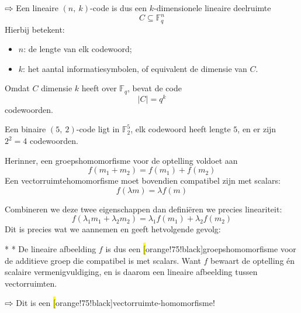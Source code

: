 $\rightwhitearrow$ Een lineaire $(n,\ k)$-code is dus een $k$-dimensionele lineaire deelruimte
\begin{equation*}
    C \subseteq \mathbb{F}_q^n
\end{equation*}
Hierbij betekent:
\begin{itemize}
    \item $n$: de lengte van elk codewoord;
    \item $k$: het aantal informatiesymbolen, of equivalent de dimensie van $C$.
\end{itemize}
Omdat $C$ dimensie $k$ heeft over $\mathbb{F}_q$, bevat de code
\begin{equation*}
    |C| = q^k
\end{equation*}
codewoorden.

\textbf{} Een binaire $(5,\ 2)$-code ligt in $\mathbb{F}_2^5$, elk codewoord heeft lengte $5$, en er zijn $2^2=4$ codewoorden.


Herinner, een groepshomomorfisme voor de optelling voldoet aan
\begin{equation*}
    f(m_1 + m_2) = f(m_1) + f(m_2)
\end{equation*}
Een vectorruimtehomomorfisme moet bovendien compatibel zijn met scalars:
\begin{equation*}
    f(\lambda m) = \lambda f(m)
\end{equation*}

Combineren we deze twee eigenschappen dan definiëren we precies lineariteit:
\begin{equation*}
    f(\lambda_1m_1 + \lambda_2m_2) = \lambda_1 f(m_1) + \lambda_2 f(m_2)
\end{equation*}
Dit is precies wat we aannemen en geeft hetvolgende gevolg:

\newpage
\begin{nicecorollary}*\label{gevolg:l8_lineaire-code}
    \nextpart[]*
    De lineaire afbeelding $f$ is dus een \hl[orange!75!black]{groepshomomorfisme} voor de additieve groep die compatibel is met scalars. Want $f$ bewaart de optelling én scalaire vermenigvuldiging, en is daarom een lineaire afbeelding tussen vectorruimten.

    \vspace{0.2cm}

    $\rightwhitearrow$ Dit is een \hl[orange!75!black]{vectorruimte-homomorfisme}!
\end{nicecorollary}

